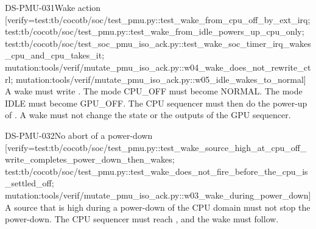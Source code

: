 \begin{requirement}{DS-PMU-031}{Wake action}
[verify={test:tb/cocotb/soc/test_pmu.py::test_wake_from_cpu_off_by_ext_irq; test:tb/cocotb/soc/test_pmu.py::test_wake_from_idle_powers_up_cpu_only; test:tb/cocotb/soc/test_soc_pmu_iso_ack.py::test_wake_soc_timer_irq_wakes_cpu_and_cpu_takes_it; mutation:tools/verif/mutate_pmu_iso_ack.py::w04_wake_does_not_rewrite_ctrl; mutation:tools/verif/mutate_pmu_iso_ack.py::w05_idle_wakes_to_normal}]
A wake must write . The mode CPU\_OFF must become NORMAL. The mode IDLE must become GPU\_OFF. The CPU sequencer must then do the power-up of . A wake must not change the state or the outputs of the GPU sequencer.
\end{requirement}

\begin{requirement}{DS-PMU-032}{No abort of a power-down}
[verify={test:tb/cocotb/soc/test_pmu.py::test_wake_source_high_at_cpu_off_write_completes_power_down_then_wakes; test:tb/cocotb/soc/test_pmu.py::test_wake_does_not_fire_before_the_cpu_is_settled_off; mutation:tools/verif/mutate_pmu_iso_ack.py::w03_wake_during_power_down}]
A source that is high during a power-down of the CPU domain must not stop the power-down. The CPU sequencer must reach , and the wake must follow.
\end{requirement}

